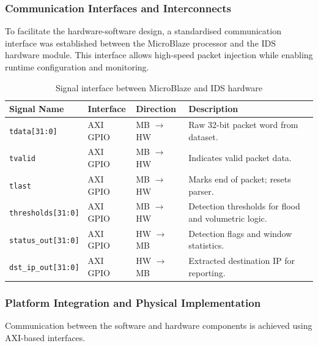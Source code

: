 \newpage
\subsubsection{Communication Interfaces and Interconnects}
To facilitate the hardware-software design, a standardised communication
interface was established between the MicroBlaze processor and the IDS hardware
module. This interface allows high-speed packet injection while enabling runtime
configuration and monitoring.

\begin{table}[H]
    \centering
    \caption{Signal interface between MicroBlaze and IDS hardware}
    \label{tab:signal_interface}
    \begin{tabular}{l l l p{7cm}}
        \hline
        \textbf{Signal Name}        & \textbf{Interface} & \textbf{Direction}  & \textbf{Description}                                 \\
        \hline
        \texttt{tdata[31:0]}        & AXI GPIO           & MB $\rightarrow$ HW & Raw 32-bit packet word from dataset.                 \\
        \texttt{tvalid}             & AXI GPIO           & MB $\rightarrow$ HW & Indicates valid packet data.                         \\
        \texttt{tlast}              & AXI GPIO           & MB $\rightarrow$ HW & Marks end of packet; resets parser.                  \\
        \texttt{thresholds[31:0]}   & AXI GPIO           & MB $\rightarrow$ HW & Detection thresholds for flood and volumetric logic. \\
        \texttt{status\_out[31:0]}  & AXI GPIO           & HW $\rightarrow$ MB & Detection flags and window statistics.               \\
        \texttt{dst\_ip\_out[31:0]} & AXI GPIO           & HW $\rightarrow$ MB & Extracted destination IP for reporting.              \\
        \hline
    \end{tabular}
\end{table}



\subsubsection{Platform Integration and Physical Implementation}
Communication between the software and hardware components is achieved using
AXI-based interfaces.

